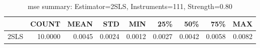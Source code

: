 \begin{table}[ht]
\centering
\caption{mse summary: Estimator=2SLS, Instruments=111, Strength=0.80}
\begin{tabular}{lrrrrrrrr}
\toprule
 & COUNT & MEAN & STD & MIN & 25\% & 50\% & 75\% & MAX \\
\midrule
2SLS & 10.0000 & 0.0045 & 0.0024 & 0.0012 & 0.0027 & 0.0042 & 0.0058 & 0.0082 \\
\bottomrule
\end{tabular}
\end{table}

